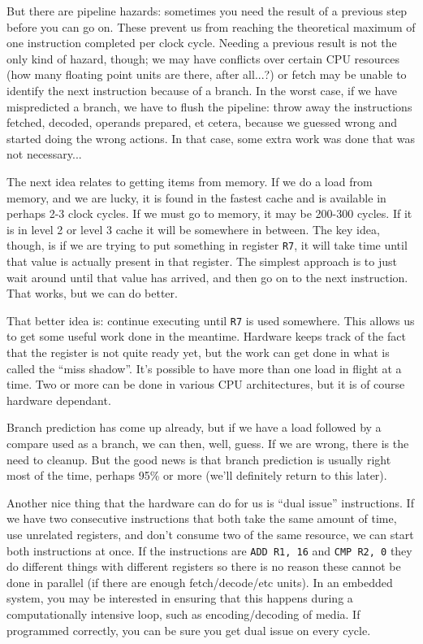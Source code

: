 \documentclass[a4paper]{report}
\begin{document}
But there are pipeline hazards: sometimes you need the result of a previous step before you can go on. These prevent us from reaching the theoretical maximum of one instruction completed per clock cycle. Needing a previous result is not the only kind of hazard, though; we may have conflicts over certain CPU resources (how many floating point units are there, after all...?) or fetch may be unable to identify the next instruction because of a branch. In the worst case, if we have mispredicted a branch, we have to flush the pipeline: throw away the instructions fetched, decoded, operands prepared, et cetera, because we guessed wrong and started doing the wrong actions. In that case, some extra work was done that was not necessary... 

The next idea relates to getting items from memory. If we do a load from memory, and we are lucky, it is found in the fastest cache and is available in perhaps 2-3 clock cycles. If we must go to memory, it may be 200-300 cycles. If it is in level 2 or level 3 cache it will be somewhere in between. The key idea, though, is if we are trying to put something in register \texttt{R7}, it will take time until that value is actually present in that register. The simplest approach is to just wait around until that value has arrived, and then go on to the next instruction. That works, but we can do better.

That better idea is: continue executing until \texttt{R7} is used somewhere. This allows us to get some useful work done in the meantime. Hardware keeps track of the fact that the register is not quite ready yet, but the work can get done in what is called the ``miss shadow''. It's possible to have more than one load in flight at a time. Two or more can be done in various CPU architectures, but it is of course hardware dependant. 

Branch prediction has come up already, but if we have a load followed by a compare used as a branch, we can then, well, guess. If we are wrong, there is the need to cleanup. But the good news is that branch prediction is usually right most of the time, perhaps 95\% or more (we'll definitely return to this later).

Another nice thing that the hardware can do for us is ``dual issue'' instructions. If we have two consecutive instructions that both take the same amount of time, use unrelated registers, and don't consume two of the same resource, we can start both instructions at once. If the instructions are \texttt{ADD R1, 16} and \texttt{CMP R2, 0} they do different things with different registers so there is no reason these cannot be done in parallel (if there are enough fetch/decode/etc units). In an embedded system, you may be interested in ensuring that this happens during a computationally intensive loop, such as encoding/decoding of media. If programmed correctly, you can be sure you get dual issue on every cycle.
\end{document}
